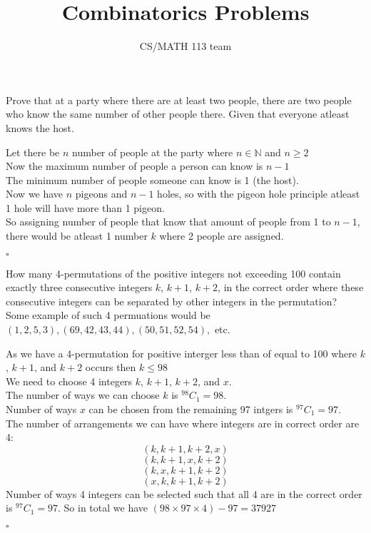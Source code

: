 \documentclass{exam}
\title{Combinatorics Problems}
\author{CS/MATH 113 team}
\begin{document}
\maketitle

\begin{questions}
    \question Prove that at a party where there are at least two people, there are two people who know the same number of other people there. Given that everyone atleast knows the host.
    \begin{solution}
        Let there be $n$ number of people at the party where $n \in \mathbb{N}$ and $n\geq2$ 
        \\Now the maximum number of people a person can know is $n-1$
        \\The minimum number of people someone can know is 1 (the host).
        \\Now we have $n$ pigeons and $n-1$ holes, so with the pigeon hole principle atleast 1 hole will have more than 1 pigeon. 
        \\So assigning number of people that know that amount of people from 1 to $n-1$, there would be atleast 1 number $k$ where 2 people are assigned.
        \begin{flushright}
            $\square$
        \end{flushright}
    \end{solution}
    \question How many 4-permutations of the positive integers not exceeding 100 contain exactly three consecutive integers $k$, $k + 1$, $k + 2$, in the correct order where these consecutive integers can be separated by other integers in the permutation? 
    \\Some example of such 4 permuations would be $(1,2,5,3), (69,42,43,44), (50,51,52,54),$ etc.
    \begin{solution}
    As we have a 4-permutation for positive interger less than of equal to 100 where $k$, $k+1$, and $k+2$ occurs then $k\leq 98$
    \\We need to choose 4 integers $k$, $k+1$, $k+2$, and $x$.
    \\The number of ways we can choose $k$ is $^{98}C_1 = 98$.
    \\Number of ways $x$ can be chosen from the remaining 97 intgers is $^{97}C_1 = 97$. 
    \\The number of arrangements we can have where integers are in correct order are 4:
    $$(k,k+1,k+2,x)$$
    $$(k,k+1,x,k+2)$$
    $$(k,x,k+1,k+2)$$
    $$(x,k,k+1,k+2)$$
    Number of ways 4 integers can be selected such that all 4 are in the correct order is $^{97}C_1 = 97$.
    So in total we have $(98\times 97 \times 4) - 97 = 37927$
    \begin{flushright}
        $\square$
    \end{flushright}
    \end{solution}


\end{questions}
\end{document}

